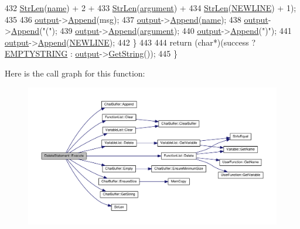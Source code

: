 \begin{DoxyCode}
432             \hyperlink{clib_8h_a67ec56eb98b49515d35005a5b3bf9a32}{StrLen}(\hyperlink{classDeleteStatement_aec9706bae02a354afec8f639e283e5b9}{name}) + 2 +
433             \hyperlink{clib_8h_a67ec56eb98b49515d35005a5b3bf9a32}{StrLen}(\hyperlink{classDeleteStatement_a0fe7f24dcfd05e0f7f449e19aaabee2d}{argument}) +
434             \hyperlink{clib_8h_a67ec56eb98b49515d35005a5b3bf9a32}{StrLen}(\hyperlink{platform_8h_a806511f4930171733227c99101dc0606}{NEWLINE}) + 1);
435 
436         \hyperlink{classSyntaxNode_a1180628cbe3fce43930cee0df5a9ce5c}{output}->\hyperlink{classCharBuffer_a045b38735f7b3007c1b98d3d7b7feafe}{Append}(msg);
437         \hyperlink{classSyntaxNode_a1180628cbe3fce43930cee0df5a9ce5c}{output}->\hyperlink{classCharBuffer_a045b38735f7b3007c1b98d3d7b7feafe}{Append}(\hyperlink{classDeleteStatement_aec9706bae02a354afec8f639e283e5b9}{name});
438         \hyperlink{classSyntaxNode_a1180628cbe3fce43930cee0df5a9ce5c}{output}->\hyperlink{classCharBuffer_a045b38735f7b3007c1b98d3d7b7feafe}{Append}(\textcolor{stringliteral}{"("});
439         \hyperlink{classSyntaxNode_a1180628cbe3fce43930cee0df5a9ce5c}{output}->\hyperlink{classCharBuffer_a045b38735f7b3007c1b98d3d7b7feafe}{Append}(\hyperlink{classDeleteStatement_a0fe7f24dcfd05e0f7f449e19aaabee2d}{argument});
440         \hyperlink{classSyntaxNode_a1180628cbe3fce43930cee0df5a9ce5c}{output}->\hyperlink{classCharBuffer_a045b38735f7b3007c1b98d3d7b7feafe}{Append}(\textcolor{stringliteral}{")"});
441         \hyperlink{classSyntaxNode_a1180628cbe3fce43930cee0df5a9ce5c}{output}->\hyperlink{classCharBuffer_a045b38735f7b3007c1b98d3d7b7feafe}{Append}(\hyperlink{platform_8h_a806511f4930171733227c99101dc0606}{NEWLINE});
442     \}
443 
444     \textcolor{keywordflow}{return} (\textcolor{keywordtype}{char}*)(success ? \hyperlink{platform_8h_a79ff1b9ff232b38c8b5600659e6bc7c2}{EMPTYSTRING} : \hyperlink{classSyntaxNode_a1180628cbe3fce43930cee0df5a9ce5c}{output}->\hyperlink{classCharBuffer_a7dfd3feaaf80f318ba44efe15b1ec44b}{GetString}());
445 \}
\end{DoxyCode}


Here is the call graph for this function\+:
\nopagebreak
\begin{figure}[H]
\begin{center}
\leavevmode
\includegraphics[width=350pt]{db/dda/classDeleteStatement_a709e8696c9ca4be32679e6a72b82de86_cgraph}
\end{center}
\end{figure}




